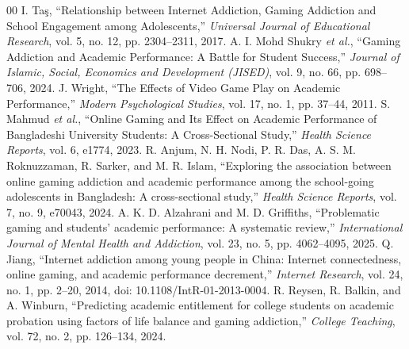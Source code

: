 \documentclass[conference]{IEEEtran}
\begin{document}
\begin{thebibliography}{00}
 I. Ta\c{s}, ``Relationship between Internet Addiction, Gaming Addiction and School Engagement among Adolescents,'' \textit{Universal Journal of Educational Research}, vol. 5, no. 12, pp. 2304--2311, 2017.
 A. I. Mohd Shukry \textit{et al.}, ``Gaming Addiction and Academic Performance: A Battle for Student Success,'' \textit{Journal of Islamic, Social, Economics and Development (JISED)}, vol. 9, no. 66, pp. 698--706, 2024.
 J. Wright, ``The Effects of Video Game Play on Academic Performance,'' \textit{Modern Psychological Studies}, vol. 17, no. 1, pp. 37--44, 2011.
 S. Mahmud \textit{et al.}, ``Online Gaming and Its Effect on Academic Performance of Bangladeshi University Students: A Cross-Sectional Study,'' \textit{Health Science Reports}, vol. 6, e1774, 2023.
 R. Anjum, N. H. Nodi, P. R. Das, A. S. M. Roknuzzaman, R. Sarker, and M. R. Islam, ``Exploring the association between online gaming addiction and academic performance among the school-going adolescents in Bangladesh: A cross-sectional study,'' \textit{Health Science Reports}, vol. 7, no. 9, e70043, 2024.
 A. K. D. Alzahrani and M. D. Griffiths, ``Problematic gaming and students' academic performance: A systematic review,'' \textit{International Journal of Mental Health and Addiction}, vol. 23, no. 5, pp. 4062--4095, 2025.
 Q. Jiang, ``Internet addiction among young people in China: Internet connectedness, online gaming, and academic performance decrement,'' \textit{Internet Research}, vol. 24, no. 1, pp. 2--20, 2014, doi: 10.1108/IntR-01-2013-0004.
 R. Reysen, R. Balkin, and A. Winburn, ``Predicting academic entitlement for college students on academic probation using factors of life balance and gaming addiction,'' \textit{College Teaching}, vol. 72, no. 2, pp. 126--134, 2024.
\end{thebibliography}
\end{document}
